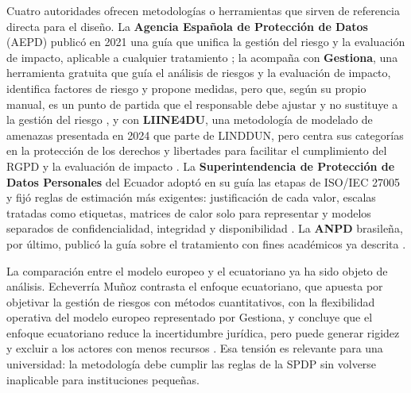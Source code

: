 Cuatro autoridades ofrecen metodologías o herramientas que sirven de referencia directa para el diseño. La \textbf{Agencia Española de Protección de Datos} (AEPD) publicó en 2021 una guía que unifica la gestión del riesgo y la evaluación de impacto, aplicable a cualquier tratamiento \cite{aepd2021riesgo}; la acompaña con \textbf{Gestiona}, una herramienta gratuita que guía el análisis de riesgos y la evaluación de impacto, identifica factores de riesgo y propone medidas, pero que, según su propio manual, es un punto de partida que el responsable debe ajustar y no sustituye a la gestión del riesgo \cite{aepd2024gestiona}, y con \textbf{LIINE4DU}, una metodología de modelado de amenazas presentada en 2024 que parte de LINDDUN, pero centra sus categorías en la protección de los derechos y libertades para facilitar el cumplimiento del RGPD y la evaluación de impacto \cite{aepd2024liine4du,deng2011linddun}. La \textbf{Superintendencia de Protección de Datos Personales} del Ecuador adoptó en su guía las etapas de ISO/IEC 27005 y fijó reglas de estimación más exigentes: justificación de cada valor, escalas tratadas como etiquetas, matrices de calor solo para representar y modelos separados de confidencialidad, integridad y disponibilidad \cite{spdp2025guia,spdp2026guiav2}. La \textbf{ANPD} brasileña, por último, publicó la guía sobre el tratamiento con fines académicos ya descrita \cite{anpd2023academicos}.

La comparación entre el modelo europeo y el ecuatoriano ya ha sido objeto de análisis. Echeverría Muñoz contrasta el enfoque ecuatoriano, que apuesta por objetivar la gestión de riesgos con métodos cuantitativos, con la flexibilidad operativa del modelo europeo representado por Gestiona, y concluye que el enfoque ecuatoriano reduce la incertidumbre jurídica, pero puede generar rigidez y excluir a los actores con menos recursos \cite{echeverria2026riesgos}. Esa tensión es relevante para una universidad: la metodología debe cumplir las reglas de la SPDP sin volverse inaplicable para instituciones pequeñas.

